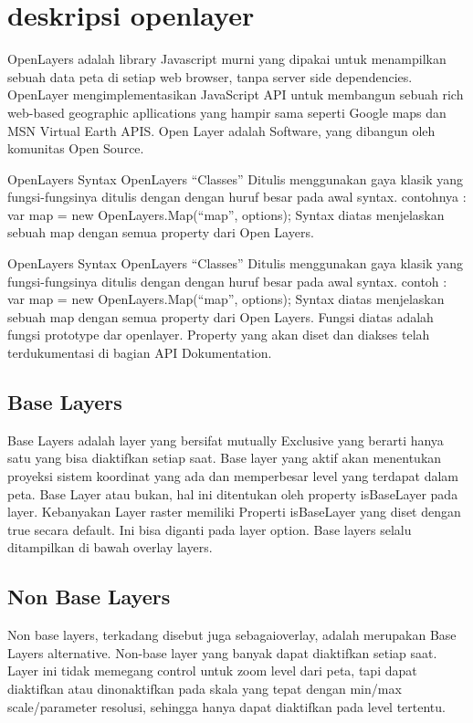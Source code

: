 

\section{deskripsi openlayer}
OpenLayers adalah library Javascript murni yang dipakai untuk menampilkan sebuah data peta di setiap web browser, tanpa server side dependencies.
OpenLayer mengimplementasikan JavaScript API untuk membangun sebuah rich web-based geographic apllications yang hampir sama seperti Google maps dan MSN Virtual Earth APIS.
Open Layer adalah Software, yang dibangun oleh komunitas Open Source.
  
OpenLayers Syntax
OpenLayers “Classes”
Ditulis menggunakan gaya klasik yang fungsi-fungsinya ditulis dengan dengan huruf besar pada awal syntax.
contohnya : var map = new OpenLayers.Map(“map”, options);
Syntax diatas menjelaskan sebuah map dengan semua property dari Open Layers. 
  

  OpenLayers Syntax
  OpenLayers “Classes”
  Ditulis menggunakan gaya klasik yang fungsi-fungsinya ditulis dengan dengan huruf besar pada awal syntax.
  contoh : var map = new OpenLayers.Map(“map”, options);
  Syntax diatas menjelaskan sebuah map dengan semua property dari Open Layers.
  Fungsi diatas adalah fungsi prototype dar openlayer. Property yang akan diset dan diakses telah terdukumentasi di bagian API   Dokumentation.

\subsection{Base Layers}
 Base Layers adalah layer yang bersifat mutually Exclusive yang berarti hanya satu yang bisa diaktifkan setiap saat.
 Base layer yang aktif akan menentukan proyeksi sistem koordinat yang ada dan memperbesar level yang terdapat dalam peta. 
 Base Layer atau bukan, hal ini ditentukan oleh property isBaseLayer pada layer. Kebanyakan Layer raster memiliki Properti isBaseLayer yang diset dengan true secara default. 
 Ini bisa diganti pada layer option. Base layers selalu ditampilkan di bawah overlay layers.

\subsection{Non Base Layers}
Non base layers, terkadang disebut juga sebagaioverlay, adalah merupakan Base Layers alternative. Non-base layer yang banyak dapat diaktifkan setiap saat.
Layer ini tidak memegang control untuk zoom level dari peta, tapi dapat diaktifkan atau dinonaktifkan pada skala yang tepat dengan min/max scale/parameter resolusi, sehingga hanya dapat diaktifkan pada level tertentu.

